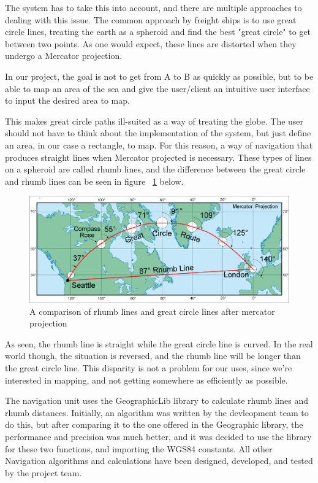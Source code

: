 The system has to take this into account, and there are multiple approaches to dealing with this issue. The common approach by freight ships is to use great circle lines, treating the earth as a spheroid and find the best "great circle" to get between two points. As one would expect, these lines are distorted when they undergo a Mercator projection. 

In our project, the goal is not to get from A to B as quickly as possible, but to be able to map an area of the sea and give the user/client an intuitive user interface to input the desired area to map. 

This makes great circle paths ill-suited as a way of treating the globe. The user should not have to think about the implementation of the system, but just define an area, in our case a rectangle, to map. For this reason, a way of navigation that produces straight lines when Mercator projected is necessary. These types of lines on a spheroid are called rhumb lines, and the difference between the great circle and rhumb lines can be seen in figure ~\ref{fig:rhumbgreatcirclemercator} below.

\begin{figure}[H]
\centering
\includegraphics[width=0.9\linewidth]{Images/Implementation/Rhumb_vs_great_circle_mercator_projection}
\caption{A comparison of rhumb lines and great circle lines after mercator projection}
\label{fig:rhumbgreatcirclemercator}
\end{figure}

As seen, the rhumb line is straight while the great circle line is curved. In the real world though, the situation is reversed, and the rhumb line will be longer than the great circle line. This disparity is not a problem for our uses, since we're interested in mapping, and not getting somewhere as efficiently as possible. 

The navigation unit uses the GeographicLib library to calculate rhumb lines and rhumb distances. Initially, an algorithm was written by the devleopment team to do this, but after comparing it to the one offered in the Geographic library, the performance and precision was much better, and it was decided to use the library for these two functions, and importing the WGS84 constants. All other Navigation algorithms and calculations have been designed, developed, and tested by the project team.

